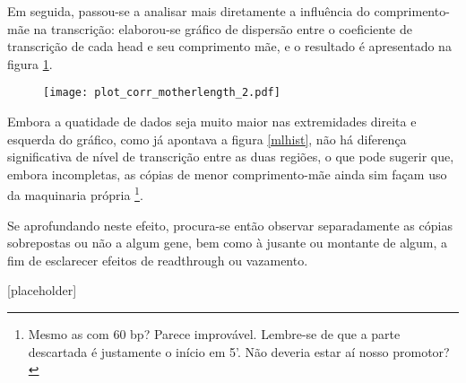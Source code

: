 \documentclass{article}
\begin{document}
\begin{multicols}{2}
Em seguida, passou-se a analisar mais diretamente a influência do comprimento-mãe na transcrição: elaborou-se gráfico de dispersão entre o coeficiente de transcrição de cada head e seu comprimento mãe, e o resultado é apresentado na figura \ref{mlrc}.

\begin{figure}[H]
	\centering
	\label{mlrc}
	\texttt{[image: plot\_corr\_motherlength\_2.pdf]}
\end{figure}

	Embora a quatidade de dados seja muito maior nas extremidades direita e esquerda do gráfico, como já apontava a figura \ref{mlhist}, não há diferença significativa de nível de transcrição entre as duas regiões, o que pode sugerir que, embora incompletas, as cópias de menor comprimento-mãe ainda sim façam uso da maquinaria própria \footnote{Mesmo as com 60 bp? Parece improvável. Lembre-se de que a parte descartada é justamente o início em 5'. Não deveria estar aí nosso promotor?}.

Se aprofundando neste efeito, procura-se então observar separadamente as cópias sobrepostas ou não a algum gene, bem como à jusante ou montante de algum, a fim de esclarecer efeitos de readthrough ou vazamento.

	[placeholder]


\end{multicols}
\end{document}
